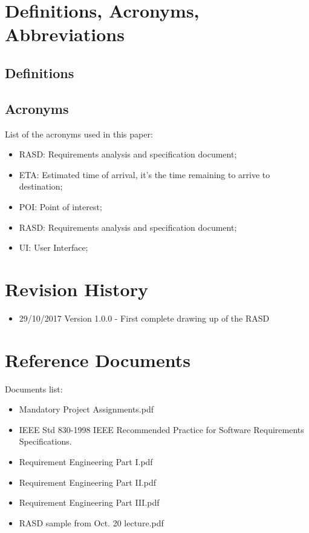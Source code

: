\section{Definitions, Acronyms, Abbreviations}
%
\subsection{Definitions}
%
\subsection{Acronyms}
List of the acronyms used in this paper:
\begin{itemize}
\item RASD: Requirements analysis and specification document;
\item ETA: Estimated time of arrival, it's the time remaining to arrive to destination;
\item POI: Point of interest;
\item RASD: Requirements analysis and specification document;
\item UI: User Interface;
\end{itemize}
%
%
\section{Revision History}
\begin{itemize}
\item 29/10/2017 Version 1.0.0 - First complete drawing up of the RASD
\end{itemize}
%
%
\section{Reference Documents}
Documents list:
\begin{itemize}
\item Mandatory Project Assignments.pdf
\item IEEE Std 830-1998 IEEE Recommended Practice for Software Requirements
Specifications.
\item Requirement Engineering Part I.pdf
\item Requirement Engineering Part II.pdf
\item Requirement Engineering Part III.pdf
\item RASD sample from Oct. 20 lecture.pdf
\end{itemize}
%
%

